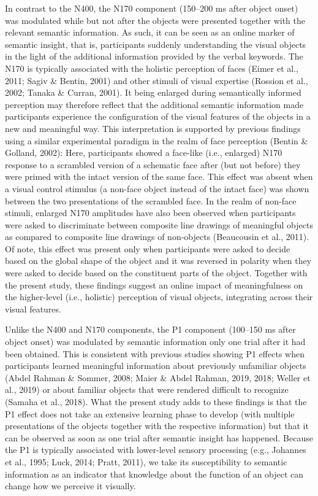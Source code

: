 \documentclass[
  english,
  doc,12pt,twoside,floatsintext]{apa7}
\begin{document}
In contrast to the N400, the N170 component (150--200 ms after object onset) was modulated while but not after the objects were presented together with the relevant semantic information. As such, it can be seen as an online marker of semantic insight, that is, participants suddenly understanding the visual objects in the light of the additional information provided by the verbal keywords. The N170 is typically associated with the holistic perception of faces (Eimer et al., 2011; Sagiv \& Bentin, 2001) and other stimuli of visual expertise (Rossion et al., 2002; Tanaka \& Curran, 2001). It being enlarged during semantically informed perception may therefore reflect that the additional semantic information made participants experience the configuration of the visual features of the objects in a new and meaningful way. This interpretation is supported by previous findings using a similar experimental paradigm in the realm of face perception (Bentin \& Golland, 2002): Here, participants showed a face-like (i.e., enlarged) N170 response to a scrambled version of a schematic face after (but not before) they were primed with the intact version of the same face. This effect was absent when a visual control stimulus (a non-face object instead of the intact face) was shown between the two presentations of the scrambled face. In the realm of non-face stimuli, enlarged N170 amplitudes have also been observed when participants were asked to discriminate between composite line drawings of meaningful objects as compared to composite line drawings of non-objects (Beaucousin et al., 2011). Of note, this effect was present only when participants were asked to decide based on the global shape of the object and it was reversed in polarity when they were asked to decide based on the constituent parts of the object. Together with the present study, these findings suggest an online impact of meaningfulness on the higher-level (i.e., holistic) perception of visual objects, integrating across their visual features.

Unlike the N400 and N170 components, the P1 component (100--150 ms after object onset) was modulated by semantic information only one trial after it had been obtained. This is consistent with previous studies showing P1 effects when participants learned meaningful information about previously unfamiliar objects (Abdel Rahman \& Sommer, 2008; Maier \& Abdel Rahman, 2019, 2018; Weller et al., 2019) or about familiar objects that were rendered difficult to recognize (Samaha et al., 2018). What the present study adds to these findings is that the P1 effect does not take an extensive learning phase to develop (with multiple presentations of the objects together with the respective information) but that it can be observed as soon as one trial after semantic insight has happened. Because the P1 is typically associated with lower-level sensory processing (e.g., Johannes et al., 1995; Luck, 2014; Pratt, 2011), we take its susceptibility to semantic information as an indicator that knowledge about the function of an object can change how we perceive it visually.
\end{document}
